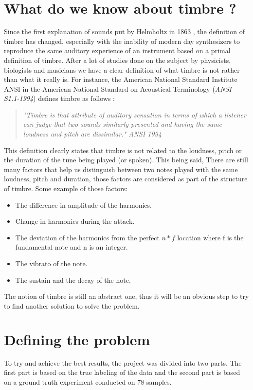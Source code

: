 \documentclass[hidelinks,12pt]{report}
\begin{document}
\section{What do we know about timbre ?}
Since the first explanation of sounds put by Helmholtz in 1863 \cite{H95}, the definition of timbre has changed, especially with the inability of modern day synthesizers to reproduce the same auditory experience of an instrument based on a primal definition of timbre. After a lot of studies done on the subject by physicists, biologists and musicians we have a clear definition of what timbre is not rather than what it really is. For instance, the American National Standard Institute ANSI in the American National Standard on Acoustical Terminology (\textit{ANSI S1.1-1994}) defines timbre as follows :
\begin{quote}
\textit{"Timbre is that attribute of auditory sensation in terms of which a listener can judge that two sounds similarly presented and having the same loudness and pitch are dissimilar." ANSI 1994}
\end{quote}
This definition clearly states that timbre is not related to the loudness, pitch or the duration of the tune being played (or spoken). This being said, There are still many factors that help us distinguish between two notes played with the same loudness, pitch and duration, those factors are considered as part of the structure of timbre. Some example of those factors:
\begin{itemize}
\item The difference in amplitude of the harmonics.
\item Change in harmonics during the attack.
\item The deviation of the harmonics from the perfect $n*f$ location where f is the fundamental note and n is an integer.
\item The vibrato of the note.
\item The sustain and the decay of the note. 
\end{itemize}
The notion of timbre is still an abstract one, thus it will be an obvious step to try to find another solution to solve the problem.
\section{Defining the problem}
To try and achieve the best results, the project was divided into two parts. The first part is based on the true labeling of the data and the second part is based on a ground truth experiment conducted on 78 samples.
\end{document}
